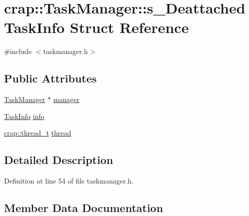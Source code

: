 \hypertarget{structcrap_1_1_task_manager_1_1s___deattached_task_info}{}\section{crap\+:\+:Task\+Manager\+:\+:s\+\_\+\+Deattached\+Task\+Info Struct Reference}
\label{structcrap_1_1_task_manager_1_1s___deattached_task_info}


{\ttfamily \#include $<$taskmanager.\+h$>$}

\subsection*{Public Attributes}
\begin{DoxyCompactItemize}
\item 
\hyperlink{classcrap_1_1_task_manager}{Task\+Manager} $\ast$ \hyperlink{structcrap_1_1_task_manager_1_1s___deattached_task_info_a546d9527f7d1b8f3f9a0eebd83a332a4}{manager}
\item 
\hyperlink{classcrap_1_1_task_manager_a298a79f168fc914a5a8a98f87bb193ad}{Task\+Info} \hyperlink{structcrap_1_1_task_manager_1_1s___deattached_task_info_a2fd0482f764c9d4d38b30e29781e5b1b}{info}
\item 
\hyperlink{namespacecrap_acd6ada6ce68b7a664e02cc09a05cdeb3}{crap\+::thread\+\_\+t} \hyperlink{structcrap_1_1_task_manager_1_1s___deattached_task_info_a9e227e898c48d1326f76b0d307cdbf55}{thread}
\end{DoxyCompactItemize}


\subsection{Detailed Description}


Definition at line 54 of file taskmanager.\+h.



\subsection{Member Data Documentation}
\hypertarget{structcrap_1_1_task_manager_1_1s___deattached_task_info_a2fd0482f764c9d4d38b30e29781e5b1b}{}
